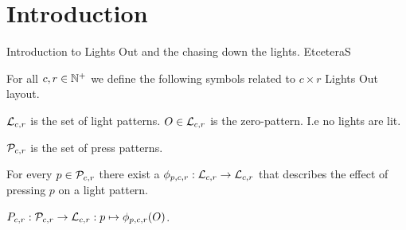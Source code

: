 \section{Introduction}

Introduction to Lights Out and the chasing down the lights. EtceteraS

\begin{definition}
  For all $c,r\in\mathbb{N}^{+}$ we define the following symbols related to
  $c \times r$ Lights Out layout.

  $\mathcal{L}_{c,r}$ is the set of light patterns. $O \in \mathcal{L}_{c,r}$ is the
  zero-pattern. I.e no lights are lit.

  $\mathcal{P}_{c,r}$ is the set of press patterns.

  For every $p\in\mathcal{P}_{c,r}$ there exist a $\phi_{p,c,r} : \mathcal{L}_{c,r}
  \rightarrow \mathcal{L}_{c,r}$ that describes the effect of pressing $p$ on
  a light pattern. 

  $P_{c,r} : \mathcal{P}_{c,r} \rightarrow \mathcal{L}_{c,r} : p \mapsto \phi_{p,c,r}(O)$.
\end{definition}
